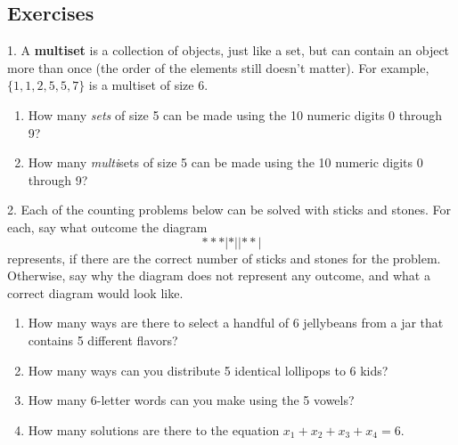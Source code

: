 \documentclass[10pt,]{book}
\newcommand{\terminology}[1]{\textbf{#1}}
\theoremstyle{plain}
\theoremstyle{definition}
\numberwithin{equation}{chapter}
\begin{document}
\subsection[Exercises]{Exercises}\label{exercises_stars-and-bars}
\begin{exerciselist}
\item[1.]\hypertarget{exercise-95}{}
                A
                \terminology{multiset}
                is a collection of objects, just like a set, but can contain an object more than once (the order of the elements still doesn't matter). For example,
                \(\{1,1, 2, 5, 5, 7\}\)
                is a multiset of size 6.
            \leavevmode%
\begin{enumerate}[label=(\alph*)]
\item\hypertarget{li-315}{}
                        How many
                        \emph{sets}
                        of size 5 can be made using the 10 numeric digits 0 through 9?
\item\hypertarget{li-316}{}
                        How many
                        \emph{multi}sets of size 5 can be made using the 10 numeric digits 0 through 9?
\end{enumerate}

\par\smallskip
\item[2.]\hypertarget{exercise-96}{}
                Each of the counting problems below can be solved with sticks and stones. For each, say what outcome the diagram
                \begin{equation*}
                    ***|*||**|
                \end{equation*}
                represents, if there are the correct number of sticks and stones for the problem. Otherwise, say why the diagram does not represent any outcome, and what a correct diagram would look like.
            \leavevmode%
\begin{enumerate}[label=(\alph*)]
\item\hypertarget{li-319}{}
                        How many ways are there to select a handful of 6 jellybeans from a jar that contains 5 different flavors?
\item\hypertarget{li-320}{}
                        How many ways can you distribute 5 identical lollipops to 6 kids?
\item\hypertarget{li-321}{}
                        How many 6-letter words can you make using the 5 vowels?
\item\hypertarget{li-322}{}
                        How many solutions are there to the equation
                        \(x_1 + x_2 + x_3 + x_4 = 6\).
\end{enumerate}


\end{exerciselist}
\end{document}

